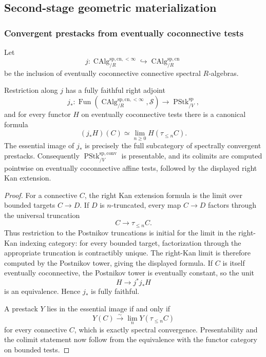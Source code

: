 \subsection{Second-stage geometric materialization}

\subsubsection{Convergent prestacks from eventually coconnective tests}

Let
\[
    j:
    \operatorname{CAlg}^{\mathrm{sp,cn},<\infty}_{/R}
    \hookrightarrow
    \operatorname{CAlg}^{\mathrm{sp,cn}}_{/R}
\]
be the inclusion of eventually coconnective connective spectral $R$-algebras.

\begin{proposition}
\label{prop:bnli-convergent-bounded-tests}
Restriction along $j$ has a fully faithful right adjoint
\[
    j_*:
    \operatorname{Fun}
    \left(
      \operatorname{CAlg}^{\mathrm{sp,cn},<\infty}_{/R},
      \mathcal S
    \right)
    \longrightarrow
    \operatorname{PStk}^{\mathrm{sp}}_{/V},
\]
and for every functor $H$ on eventually coconnective tests there is a
canonical formula
\[
\boxed{
    (j_*H)(C)
    \simeq
    \lim_{n\geq0}H(\tau_{\leq n}C).}
\]
The essential image of $j_*$ is precisely the full subcategory of spectrally
convergent prestacks.  Consequently
$\operatorname{PStk}^{\mathrm{sp,conv}}_{/V}$ is presentable, and its
colimits are computed pointwise on eventually coconnective affine tests,
followed by the displayed right Kan extension.
\end{proposition}

\begin{proof}
For a connective $C$, the right Kan extension formula is the limit over
bounded targets $C\to D$.  If $D$ is $n$-truncated, every map $C\to D$
factors through the universal truncation
\[
    C\longrightarrow\tau_{\leq n}C.
\]
Thus restriction to the Postnikov truncations is initial for the limit in the
right-Kan indexing category: for every bounded target, factorization through
the appropriate truncation is contractibly unique.  The right-Kan limit is
therefore computed by the Postnikov tower, giving the displayed formula.  If $C$ is itself
eventually coconnective, the Postnikov tower is eventually constant, so the
unit
\[
    H\longrightarrow j^*j_*H
\]
is an equivalence.  Hence $j_*$ is fully faithful.

A prestack $Y$ lies in the essential image if and only if
\[
    Y(C)\xrightarrow{\sim}\lim_nY(\tau_{\leq n}C)
\]
for every connective $C$, which is exactly spectral convergence.  Presentability
and the colimit statement now follow from the equivalence with the functor
category on bounded tests.
\end{proof}

